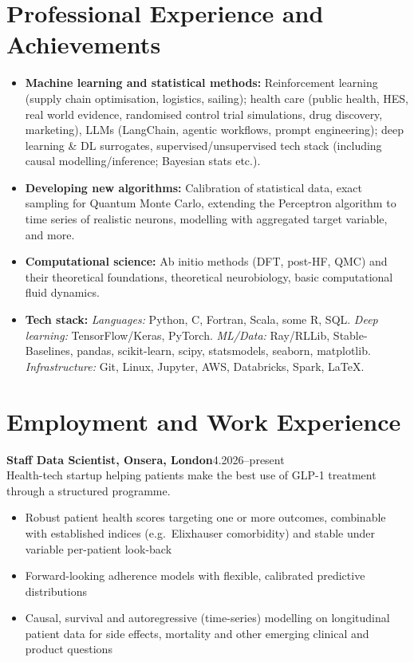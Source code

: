 \documentclass[11pt,a4paper]{article}
\newcommand{\entry}[3]{%
    \noindent\textbf{#1}\hfill #2\\
    #3\par\vspace{6pt}%
}
\begin{document}
\section*{Professional Experience and Achievements}

\begin{itemize}[leftmargin=*, nosep, itemsep=3pt]
    \item \textbf{Machine learning and statistical methods:} Reinforcement learning (supply chain optimisation, logistics, sailing); health care (public health, HES, real world evidence, randomised control trial simulations, drug discovery, marketing), LLMs (LangChain, agentic workflows, prompt engineering); deep learning \& DL surrogates, supervised/unsupervised tech stack (including causal modelling/inference; Bayesian stats etc.).

    \item \textbf{Developing new algorithms:} Calibration of statistical data, exact sampling for Quantum Monte Carlo, extending the Perceptron algorithm to time series of realistic neurons, modelling with aggregated target variable, and more.

    \item \textbf{Computational science:} Ab initio methods (DFT, post-HF, QMC) and their theoretical foundations, theoretical neurobiology, basic computational fluid dynamics.

    \item \textbf{Tech stack:} \textit{Languages:} Python, C, Fortran, Scala, some R, SQL. \textit{Deep learning:} TensorFlow/\allowbreak Keras, PyTorch. \textit{ML/Data:} Ray/RLLib, Stable-Baselines, pandas, scikit-learn, scipy, \mbox{statsmodels}, seaborn, matplotlib. \textit{Infrastructure:} Git, Linux, Jupyter, AWS, Databricks, Spark, \LaTeX.
\end{itemize}

\section*{Employment and Work Experience}

\entry{Staff Data Scientist, Onsera, London}{4.2026--present}{%
Health-tech startup helping patients make the best use of GLP-1 treatment through a structured programme.
\begin{itemize}[nosep, leftmargin=2\parindent, itemsep=2pt]
    \item Robust patient health scores targeting one or more outcomes, combinable with established indices (e.g.\ Elixhauser comorbidity) and stable under variable per-patient look-back
    \item Forward-looking adherence models with flexible, calibrated predictive distributions
    \item Causal, survival and autoregressive (time-series) modelling on longitudinal patient data for side effects, mortality and other emerging clinical and product questions
\end{itemize}}
\end{document}
